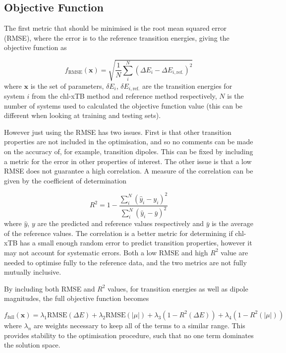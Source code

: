 \subsection{Objective Function}
\label{subsec:obj_func}
The first metric that should be minimised is the root mean squared error (RMSE), 
where the error is to the reference transition energies, giving the objective function 
as

\begin{equation}
f_{\text{RMSE}}\left(\mathbf{x}\right) = \sqrt{ \frac{1}{N} \sum^N_i \left( \Delta E_i  - \Delta E_{i, \text{ref.}}\right)^2}
\end{equation}
%
where $\textbf{x}$ is the set of parameters, $\delta E_i$, $\delta E_{i,\text{ref.}}$ 
are the transition energies for system $i$ from the chl-xTB method and reference
method respectively, $N$ is the number of systems used to calculated the objective
function value (this can be different when looking at training and testing sets).

However just using the RMSE has two issues. First is that other transition properties
are not included in the optimisation, and so no comments can be made on the accuracy 
of, for example, transition dipoles. This can be fixed by including a metric for
the error in other properties of interest. The other issue is that a low RMSE does
not guarantee a high correlation. A measure of the correlation can be given by the
coefficient of determination

\begin{equation}
R^2 = 1 - \frac{\sum^N_i \left(\hat{y}_i - y_i \right)^2}{\sum^N_i \left(\hat{y}_i - \bar{y}\right)^2}
\end{equation}
%
where $\hat{y}$, $y$ are the predicted and reference values respectively and $\bar{y}$
is the average of the reference values. The correlation is a better metric for determining
if chl-xTB has a small enough random error to predict transition properties, however
it may not account for systematic errors. Both a low RMSE and high $R^2$ value are
needed to optimise fully to the reference data, and the two metrics are not fully
mutually inclusive.

By including both RMSE and $R^2$ values, for transition energies as well as dipole
magnitudes, the full objective function becomes

\begin{equation}
f_{\text{full}} \left( \mathbf{x} \right) = \lambda_1 \text{RMSE} \left(\Delta E \right)+ \lambda_2 \text{RMSE}\left( \left| \mu \right| \right) + \lambda_3 \left(1 - R^2 \left( \Delta E \right)\right) + \lambda_4 \left( 1 - R^2 \left( \left| \mu \right| \right)\right)
    \label{eq:obj_func}
\end{equation}
%
where $\lambda_n$ are weights necessary to keep all of the terms to a similar range.
This provides stability to the optimisation procedure, such that no one term dominates
the solution space.


